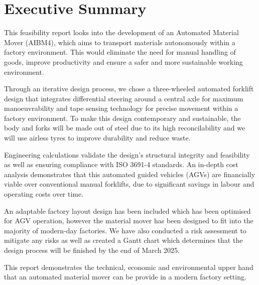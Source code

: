 \documentclass[12pt]{article}
\begin{document}
\section*{Executive Summary}

This feasibility report looks into the development of an Automated Material Mover (AIBM4), which aims to transport materials autonomously within a factory environment. This would eliminate the need for manual handling of goods, improve productivity and ensure a safer and more sustainable working environment. 
\par Through an iterative design process, we chose a three-wheeled automated forklift design that integrates differential steering around a central axle for maximum manoeuvrability and tape sensing technology for precise movement within a factory environment. To make this design contemporary and sustainable, the body and forks will be made out of steel due to its high reconcilability and we will use airless tyres to improve durability and reduce waste.
\par Engineering calculations validate the design's structural integrity and feasibility as well as ensuring compliance with ISO 3691-4  standards. An in-depth cost analysis demonstrates that this automated guided vehicles (AGVs) are financially viable over conventional manual forklifts, due to significant savings in labour and operating costs over time. 
\par An adaptable factory layout design has been included which has been optimised for AGV operation, however the material mover has been designed to fit into the majority of modern-day factories. We have also conducted a risk assessment to mitigate any risks as well as created a Gantt chart which determines that the design process will be finished by the end of March 2025.
\par This report demonstrates the technical, economic and environmental upper hand that an automated material mover can be provide in a modern factory setting.
\newpage
\tableofcontents

\newpage

\end{document}
